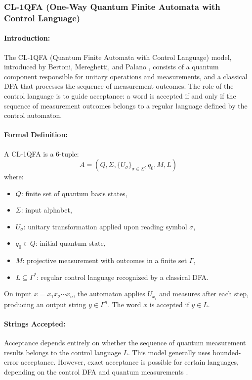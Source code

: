 \subsubsection{CL-1QFA (One-Way Quantum Finite Automata with Control Language)}

\paragraph{Introduction:}  
The CL-1QFA (Quantum Finite Automata with Control Language) model, introduced by Bertoni, Mereghetti, and Palano \cite{mereghetti2006quantum}, consists of a quantum component responsible for unitary operations and measurements, and a classical DFA that processes the sequence of measurement outcomes. The role of the control language is to guide acceptance: a word is accepted if and only if the sequence of measurement outcomes belongs to a regular language defined by the control automaton.

\paragraph{Formal Definition:}  
A CL-1QFA is a 6-tuple:
\[
A = (Q, \Sigma, \{U_\sigma\}_{\sigma \in \Sigma}, q_0, M, L)
\]
where:
\begin{itemize}
    \item $Q$: finite set of quantum basis states,
    \item $\Sigma$: input alphabet,
    \item $U_\sigma$: unitary transformation applied upon reading symbol $\sigma$,
    \item $q_0 \in Q$: initial quantum state,
    \item $M$: projective measurement with outcomes in a finite set $\Gamma$,
    \item $L \subseteq \Gamma^*$: regular control language recognized by a classical DFA.
\end{itemize}
On input $x = x_1x_2\cdots x_n$, the automaton applies $U_{x_i}$ and measures after each step, producing an output string $y \in \Gamma^n$. The word $x$ is accepted if $y \in L$.

\paragraph{Strings Accepted:}  
Acceptance depends entirely on whether the sequence of quantum measurement results belongs to the control language $L$. This model generally uses bounded-error acceptance. However, exact acceptance is possible for certain languages, depending on the control DFA and quantum measurements \cite{mereghetti2006quantum}.

